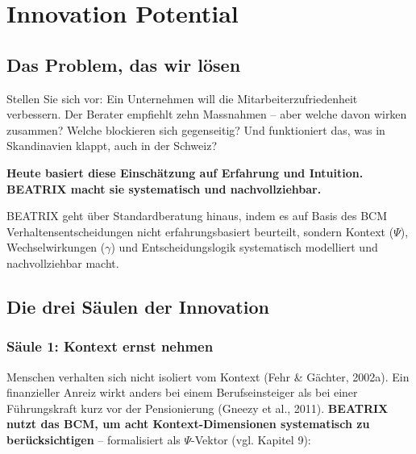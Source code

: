 \documentclass[11pt,a4paper]{article}
\begin{document}
\newpage


\section{Innovation Potential}

\subsection{Das Problem, das wir lösen}

Stellen Sie sich vor: Ein Unternehmen will die Mitarbeiterzufriedenheit verbessern. Der Berater empfiehlt zehn Massnahmen -- aber welche davon wirken zusammen? Welche blockieren sich gegenseitig? Und funktioniert das, was in Skandinavien klappt, auch in der Schweiz?

\textbf{Heute basiert diese Einschätzung auf Erfahrung und Intuition. BEATRIX macht sie systematisch und nachvollziehbar.}

BEATRIX geht über Standardberatung hinaus, indem es auf Basis des BCM Verhaltensentscheidungen nicht erfahrungsbasiert beurteilt, sondern Kontext ($\Psi$), Wechselwirkungen ($\gamma$) und Entscheidungslogik systematisch modelliert und nachvollziehbar macht.

\subsection{Die drei Säulen der Innovation}

\subsubsection{Säule 1: Kontext ernst nehmen}

Menschen verhalten sich nicht isoliert vom Kontext (Fehr \& Gächter, 2002a). Ein finanzieller Anreiz wirkt anders bei einem Berufseinsteiger als bei einer Führungskraft kurz vor der Pensionierung (Gneezy et al., 2011). \textbf{BEATRIX nutzt das BCM, um acht Kontext-Dimensionen systematisch zu berücksichtigen} -- formalisiert als $\Psi$-Vektor (vgl. Kapitel 9):
\end{document}
